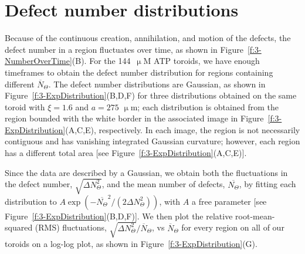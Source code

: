 \section{Defect number distributions}
Because of the continuous creation, annihilation, and motion of the defects, the defect number in a region fluctuates over time, as shown in Figure~\ref{f:3-NumberOverTime}(B).
For the 144~$\upmu$M ATP toroids, we have enough timeframes to obtain the defect number distribution for regions containing different $\overbar{N}_{\Theta}$.
The defect number distributions are Gaussian, as shown in Figure~\ref{f:3-ExpDistribution}(B,D,F) for three distributions obtained on the same toroid with $\xi = 1.6$ and $a = 275$ $\upmu$m; each distribution is obtained from the region bounded with the white border in the associated image in Figure~\ref{f:3-ExpDistribution}(A,C,E), respectively.
In each image, the region is not necessarily contiguous and has vanishing integrated Gaussian curvature; however, each region has a different total area [see Figure~\ref{f:3-ExpDistribution}(A,C,E)].

Since the data are described by a Gaussian, we obtain both the fluctuations in the defect number, $\displaystyle{\sqrt{\Delta N_{\Theta}^2}}$, and the mean number of defects, $\overbar{N_{\Theta}}$, by fitting each distribution to $A \exp (-\overbar{N_{\Theta}}^2/(2 \Delta N_{\Theta}^2))$, with $A$ a free parameter [see Figure~\ref{f:3-ExpDistribution}(B,D,F)].
We then plot the relative root-mean-squared (RMS) fluctuations, $\displaystyle{\sqrt{\Delta N_{\Theta}^2}} \bigg / \displaystyle {\overbar{N}_{\Theta}}$, vs $\overbar{N}_{\Theta}$ for every region on all of our toroids on a log-log plot, as shown in Figure~\ref{f:3-ExpDistribution}(G).

